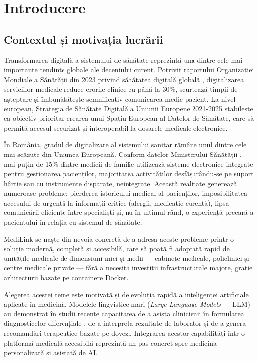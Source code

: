 \chapter{Introducere}

\section{Contextul și motivația lucrării}

Transformarea digitală a sistemului de sănătate reprezintă una dintre cele mai importante tendințe globale ale deceniului curent. Potrivit raportului Organizației Mondiale a Sănătății din 2023 privind sănătatea digitală globală \cite{who2023digital}, digitalizarea serviciilor medicale reduce erorile clinice cu până la 30\%, scurtează timpii de așteptare și îmbunătățește semnificativ comunicarea medic-pacient. La nivel european, Strategia de Sănătate Digitală a Uniunii Europene 2021-2025 \cite{eu_digital_health_2021} stabilește ca obiectiv prioritar crearea unui Spațiu European al Datelor de Sănătate, care să permită accesul securizat și interoperabil la dosarele medicale electronice.

În România, gradul de digitalizare al sistemului sanitar rămâne unul dintre cele mai scăzute din Uniunea Europeană. Conform datelor Ministerului Sănătății \cite{ms_romania_2023}, mai puțin de 15\% dintre medicii de familie utilizează sisteme electronice integrate pentru gestionarea pacienților, majoritatea activităților desfășurându-se pe suport hârtie sau cu instrumente disparate, neintegrate. Această realitate generează numeroase probleme: pierderea istoricului medical al pacienților, imposibilitatea accesului de urgență la informații critice (alergii, medicație curentă), lipsa comunicării eficiente între specialiști și, nu în ultimul rând, o experiență precară a pacientului în relația cu sistemul de sănătate.

MediLink se naște din nevoia concretă de a adresa aceste probleme printr-o soluție modernă, completă și accesibilă, care să poată fi adoptată rapid de unitățile medicale de dimensiuni mici și medii — cabinete medicale, policlinici și centre medicale private — fără a necesita investiții infrastructurale majore, grație arhitecturii bazate pe containere Docker.

Alegerea acestei teme este motivată și de evoluția rapidă a inteligenței artificiale aplicate în medicină. Modelele lingvistice mari (\textit{Large Language Models} --- LLM) au demonstrat în studii recente capacitatea de a asista clinicienii în formularea diagnosticelor diferențiale \cite{singhal2023large}, de a interpreta rezultate de laborator și de a genera recomandări terapeutice bazate pe dovezi. Integrarea acestor capabilități într-o platformă medicală accesibilă reprezintă un pas concret spre medicina personalizată și asistată de AI.

